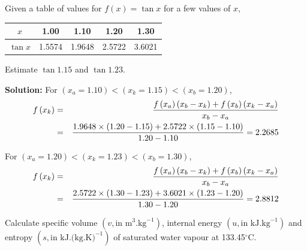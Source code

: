     \begin{list}{\bf Example :~}{}
%       
         \item Given a table of values for $f(x)=\tan{x}$ for a few values of $x$,
            \begin{center}
               \begin{tabular}{c | c c c c}
                   $x$        & 1.00   & 1.10   & 1.20   & 1.30   \\
                   \hline
                   $\tan{x}$  & 1.5574 & 1.9648 & 2.5722 & 3.6021 \\
               \end{tabular}
            \end{center}
            Estimate $\tan{1.15}$ and $\tan{1.23}$.

            {\bf Solution:} For $\left(x_{a}=1.10\right) < \left(x_{k}=1.15\right) < \left(x_{b}=1.20\right)$,
               \begin{eqnarray}
                  f\left(x_{k}\right) &=& \displaystyle\frac{f\left(x_{a}\right)\left(x_{b}-x_{k}\right) + f\left(x_{b}\right)\left(x_{k}-x_{a}\right)}{x_{b}-x_{a}} \nonumber \\
                                     &=& \displaystyle\frac{1.9648\times(1.20-1.15) + 2.5722\times(1.15-1.10)}{1.20-1.10} = 2.2685 \nonumber
               \end{eqnarray}

For  $\left(x_{a}=1.20\right) < \left(x_{k}=1.23\right) < \left(x_{b}=1.30\right)$,
               \begin{eqnarray}
                  f\left(x_{k}\right) &=& \displaystyle\frac{f\left(x_{a}\right)\left(x_{b}-x_{k}\right) + f\left(x_{b}\right)\left(x_{k}-x_{a}\right)}{x_{b}-x_{a}} \nonumber \\
                                     &=& \displaystyle\frac{2.5722\times(1.30-1.23) + 3.6021\times(1.23-1.20)}{1.30-1.20} = 2.8812 \nonumber
               \end{eqnarray}
%
         \item Calculate specific volume $\left(v, \text{in m}^{3}\text{.kg}^{-1}\right)$, internal energy $\left(u, \text{in kJ.kg}^{-1}\right)$ and entropy $\left(s, \text{in kJ.(kg.K)}^{-1}\right)$ of saturated water vapour at 133.45$^{\circ}$C.


\end{list}
